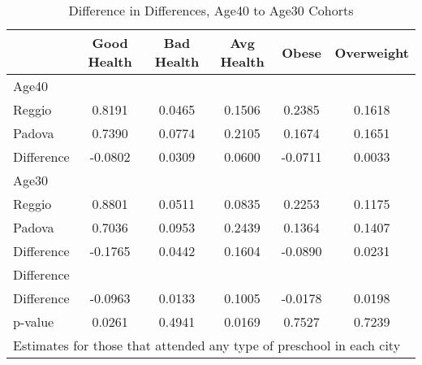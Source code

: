 \begin{table}[htbp]\centering
\caption{Difference in Differences, Age40 to Age30 Cohorts}
\begin{tabular}{l*{5}{c}}
\hline\hline
            & Good Health&  Bad Health&  Avg Health&       Obese&  Overweight\\
\hline
Age40       &            &            &            &            &            \\
Reggio      &      0.8191&      0.0465&      0.1506&      0.2385&      0.1618\\
Padova      &      0.7390&      0.0774&      0.2105&      0.1674&      0.1651\\
Difference  &     -0.0802&      0.0309&      0.0600&     -0.0711&      0.0033\\
\hline
Age30       &            &            &            &            &            \\
Reggio      &      0.8801&      0.0511&      0.0835&      0.2253&      0.1175\\
Padova      &      0.7036&      0.0953&      0.2439&      0.1364&      0.1407\\
Difference  &     -0.1765&      0.0442&      0.1604&     -0.0890&      0.0231\\
\hline
Difference  &            &            &            &            &            \\
Difference  &     -0.0963&      0.0133&      0.1005&     -0.0178&      0.0198\\
p-value     &      0.0261&      0.4941&      0.0169&      0.7527&      0.7239\\
\hline\hline
\multicolumn{6}{l}{\footnotesize Estimates for those that attended any type of preschool in each city}\\
\end{tabular}
\end{table}
